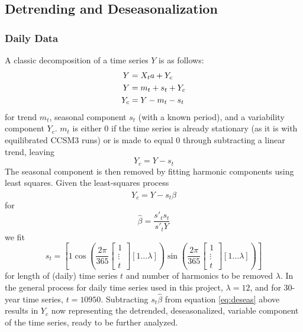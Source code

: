 \documentclass{article}
\begin{document}
\subsection{Detrending and Deseasonalization} %
\label{sec:detrend_deseas}
\subsubsection{Daily Data} %
A classic decomposition of a time series $Y$ is as follows: 
\begin{equation}
\begin{aligned}\centering
Y &= X_ta + Y_c \\
Y &= m_t + s_t + Y_c \\ 
Y_c &= Y - m_t - s_t 
\end{aligned}\end{equation}
for trend $m_t$, seasonal component $s_t$ (with a known period), and a variability component $Y_c$. $m_t$ is either $0$ if the time series is already stationary (as it is with equilibrated CCSM3 runs) or is made to equal $0$ through subtracting a linear trend, leaving
\begin{equation}
Y_c = Y-s_t
\end{equation}
The seasonal component is then removed by fitting harmonic components using least squares. Given the least-squares process
\begin{equation}Y_c = Y-s_t\hat{\beta}\label{eq:deseas}\end{equation}
for 
$$\hat{\beta} = \frac{s'_ts_t}{s'_tY}$$
we fit
\begin{equation}
s_t = \left[1 \cos\left(\frac{2\pi}{365}\left[\begin{matrix}1 \\ \vdots \\ t\end{matrix}\right][1 \hdots \lambda]\right) \sin\left(\frac{2\pi}{365}\left[\begin{matrix}1 \\ \vdots \\ t\end{matrix}\right][1 \hdots \lambda]\right) \right]
\end{equation}
for length of (daily) time series $t$ and number of harmonics to be removed $\lambda$. In the general process for daily time series used in this project, $\lambda = 12$, and for 30-year time series, $t = 10950$. Subtracting $s_t\hat{\beta}$ from equation \ref{eq:deseas} above results in $Y_c$ now representing the detrended, deseasonalized, variable component of the time series, ready to be further analyzed. 
\end{document}
